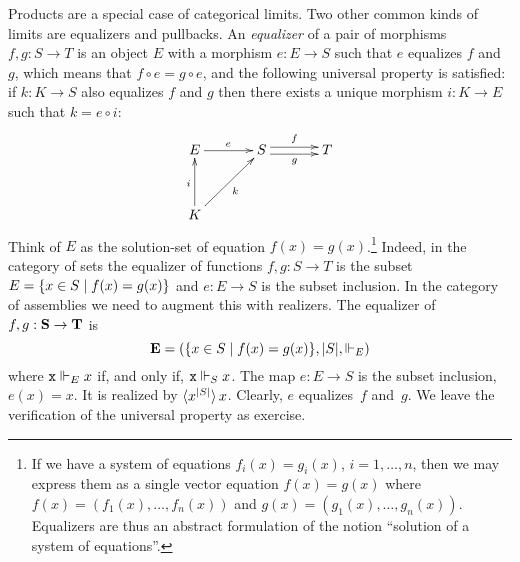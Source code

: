 Products are a special case of categorical limits. Two other common
kinds of limits are equalizers and pullbacks. An \emph{equalizer} of a
pair of morphisms $f, g : S \to T$ is an object $E$ with a morphism $e
: E \to S$ such that $e$ equalizes $f$ and $g$, which means that $f
\circ e = g \circ e$, and the following universal property is
satisfied: if $k : K \to S$ also equalizes $f$ and $g$ then there
exists a unique morphism $i : K \to E$ such that $k = e \circ i$:
%
\begin{equation*}
  \xymatrix@+1em{
    {E}
    \ar[r]^{e}
    &
    {S}
    \ar@<+0.25em>[r]^{f}
    \ar@<-0.25em>[r]_{g}
    &
    {T}
    \\
    {K}
    \ar[u]^{i}
    \ar[ru]_{k}
    & & 
  }
\end{equation*}
%
Think of $E$ as the solution-set of equation $f(x) =
g(x)$.\footnote{If we have a system of equations $f_i(x) = g_i(x)$, $i
  = 1, \ldots, n$, then we may express them as a single vector
  equation $f(x) = g(x)$ where $f(x) = (f_1(x), \ldots, f_n(x))$ and
  $g(x) = (g_1(x), \ldots, g_n(x))$. Equalizers are thus an abstract
  formulation of the notion ``solution of a system of equations''.}
Indeed, in the category of sets the equalizer of functions $f, g : S
\to T$ is the subset $E = \{x \in S \mid f(x) = g(x)\}$ and $e : E
\to S$ is the subset inclusion. In the category of assemblies we need
to augment this with realizers. The equalizer of $f, g : \mathbf{S} \to
\mathbf{T}$ is
%
\begin{equation}
  \label{eq:asm-equalizer}%
  \asm{E} =
  (\set{x \in S \such f(x) = g(x)},
   |S|,
   {\rz_E})
\end{equation}
%
where $\mathtt{x} \Vdash_E x$ if, and only if, $\mathtt{x} \Vdash_S x$. The map $e : E
\to S$ is the subset inclusion, $e(x) = x$. It is realized by
$\langle x^{|S|} \rangle\,x$. Clearly, $e$ equalizes~$f$ and~$g$. We
leave the verification of the universal property as exercise.

